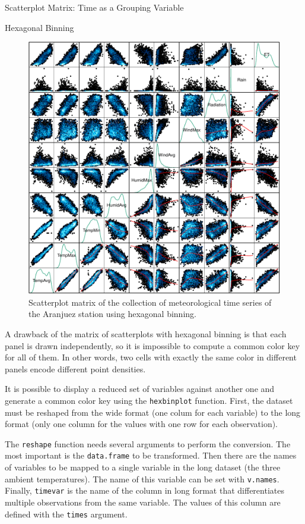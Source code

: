 \documentclass[presentation]{beamer}
\begin{document}
\begin{frame}[fragile,label=sec-1]{Scatterplot Matrix: Time as a Grouping Variable}
\begin{block}{Hexagonal Binning}
\begin{figure}[htb]
\centering
\includegraphics[width=.9\linewidth]{figs/aranjuezSplomHexbin.pdf}
\caption{\label{fig:aranjuezSplomHexbin}Scatterplot matrix of the collection of meteorological time series of the Aranjuez station using hexagonal binning.}
\end{figure}

A drawback of the matrix of scatterplots with hexagonal binning is
that each panel is drawn independently, so it is impossible to compute
a common color key for all of them. In other words, two cells with
exactly the same color in different panels encode different point
densities.

It is possible to display a reduced set of variables against
another one and generate a common color key using the \texttt{hexbinplot}
function. First, the dataset must be reshaped from the wide format
(one colum for each variable) to the long format (only one column for
the values with one row for each observation). 

The \texttt{reshape} function needs several arguments to perform the
conversion. The most important is the \texttt{data.frame} to be
transformed. Then there are the names of variables to be mapped to
a single variable in the long dataset (the three ambient
temperatures). The name of this variable can be set with
\texttt{v.names}. Finally, \texttt{timevar} is the name of the column in long format that
differentiates multiple observations from the same variable. The
values of this column are defined with the \texttt{times} argument.


\end{block}
\end{frame}
\end{document}

